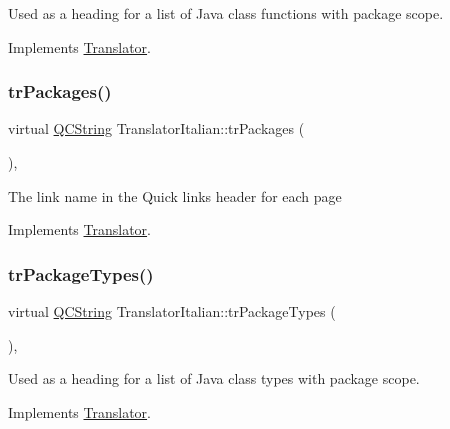 Used as a heading for a list of Java class functions with package scope. 

Implements \mbox{\hyperlink{class_translator}{Translator}}.

\mbox{\label{class_translator_italian_a5ece15f5847e8e57cdb3003d6f406bd0}} 
\subsubsection{\texorpdfstring{trPackages()}{trPackages()}}
{\footnotesize\ttfamily virtual \mbox{\hyperlink{class_q_c_string}{Q\+C\+String}} Translator\+Italian\+::tr\+Packages (\begin{DoxyParamCaption}{ }\end{DoxyParamCaption})\hspace{0.3cm}{\ttfamily [inline]}, {\ttfamily [virtual]}}

The link name in the Quick links header for each page 

Implements \mbox{\hyperlink{class_translator}{Translator}}.

\mbox{\label{class_translator_italian_a13ae8892c89793d11fcc84ac907a1df2}} 
\subsubsection{\texorpdfstring{trPackageTypes()}{trPackageTypes()}}
{\footnotesize\ttfamily virtual \mbox{\hyperlink{class_q_c_string}{Q\+C\+String}} Translator\+Italian\+::tr\+Package\+Types (\begin{DoxyParamCaption}{ }\end{DoxyParamCaption})\hspace{0.3cm}{\ttfamily [inline]}, {\ttfamily [virtual]}}

Used as a heading for a list of Java class types with package scope. 

Implements \mbox{\hyperlink{class_translator}{Translator}}.

\mbox{\label{class_translator_italian_a1301374a6a2e47a63673bb1391c54bd2}} 
